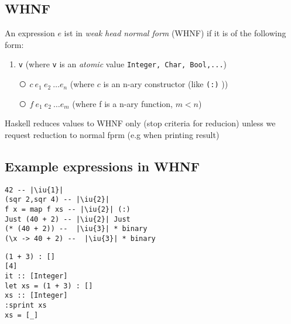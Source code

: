 \documentclass{article}
\newcommand{\Haskell}[1]{\texttt{#1}}
\begin{document}
\subsection{WHNF}
An expression $e$ ist in \emph{weak head normal form} (WHNF) if it is of the following form:\\
\newcommand{\iu}[1]{\textcircled{\raisebox{-0.1em}{#1}}}
\begin{enumerate}[\iu{1}]
\item \Haskell{v} (where \Haskell{v} is an \emph{atomic} value \Haskell{Integer, Char, Bool,...})
\item[\iu{2}] $c\ e_1\ e_2\ \ldots e_n$ (where $c$ is an n-ary constructor (like \Haskell{(:)} ))
\item[\iu{3}] $f\ e_1\ e_2 \ \ldots e_m$ (where f is a n-ary function, $m < n$)
\end{enumerate}
Haskell reduces values to WHNF only (stop criteria for reducion) unless we request reduction to normal fprm (e.g when printing result)\\
\subsection{Example expressions in WHNF}
\begin{verbatim}
42 -- |\iu{1}|
(sqr 2,sqr 4) -- |\iu{2}|
f x = map f xs -- |\iu{2}| (:)
Just (40 + 2) -- |\iu{2}| Just
(* (40 + 2)) --  |\iu{3}| * binary
(\x -> 40 + 2) --  |\iu{3}| * binary
\end{verbatim}
\begin{verbatim}
(1 + 3) : []
[4]
it :: [Integer]
let xs = (1 + 3) : []
xs :: [Integer]
:sprint xs 
xs = [_]
\end{verbatim}
\end{document}
